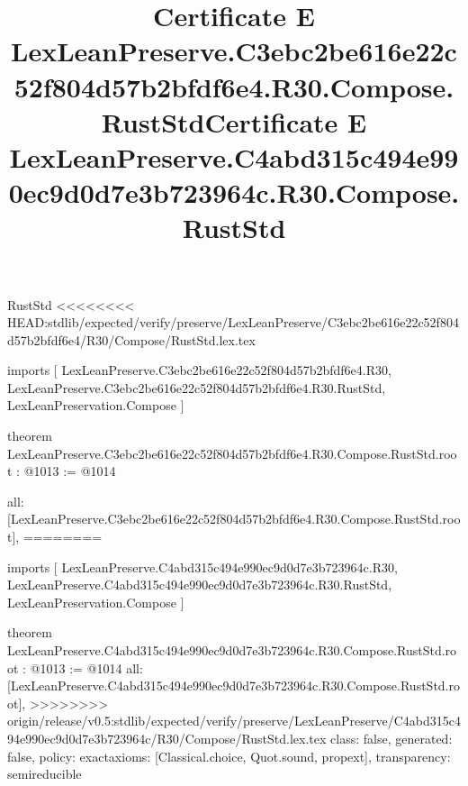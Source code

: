 \begin{lexlean}{RustStd}
<<<<<<<< HEAD:stdlib/expected/verify/preserve/LexLeanPreserve/C3ebc2be616e22c52f804d57b2bfdf6e4/R30/Compose/RustStd.lex.tex
\title{Certificate E LexLeanPreserve.C3ebc2be616e22c52f804d57b2bfdf6e4.R30.Compose.RustStd}
\begin{coremodule}
imports [
  LexLeanPreserve.C3ebc2be616e22c52f804d57b2bfdf6e4.R30,
  LexLeanPreserve.C3ebc2be616e22c52f804d57b2bfdf6e4.R30.RustStd,
  LexLeanPreservation.Compose
]

theorem LexLeanPreserve.C3ebc2be616e22c52f804d57b2bfdf6e4.R30.Compose.RustStd.root : @1013 := @1014 {
  all: [LexLeanPreserve.C3ebc2be616e22c52f804d57b2bfdf6e4.R30.Compose.RustStd.root],
========
\title{Certificate E LexLeanPreserve.C4abd315c494e990ec9d0d7e3b723964c.R30.Compose.RustStd}
\begin{coremodule}
imports [
  LexLeanPreserve.C4abd315c494e990ec9d0d7e3b723964c.R30,
  LexLeanPreserve.C4abd315c494e990ec9d0d7e3b723964c.R30.RustStd,
  LexLeanPreservation.Compose
]

theorem LexLeanPreserve.C4abd315c494e990ec9d0d7e3b723964c.R30.Compose.RustStd.root : @1013 := @1014 {
  all: [LexLeanPreserve.C4abd315c494e990ec9d0d7e3b723964c.R30.Compose.RustStd.root],
>>>>>>>> origin/release/v0.5:stdlib/expected/verify/preserve/LexLeanPreserve/C4abd315c494e990ec9d0d7e3b723964c/R30/Compose/RustStd.lex.tex
  class: false,
  generated: false,
  policy: exact{axioms: [Classical.choice, Quot.sound, propext]},
  transparency: semireducible
}


\end{coremodule}}
\end{coremodule}
\end{lexlean}
